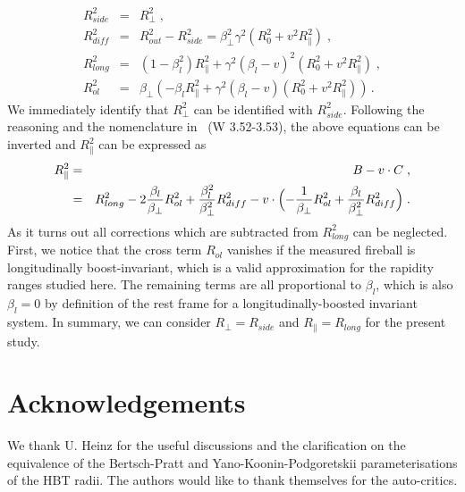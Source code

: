 \documentclass[a4paper,11pt]{scrartcl} %
\begin{document}
\begin{appendix}
\begin{eqnarray}
R_{side}^{2}    &=& R_{\perp}^{2}  \;, \\
R_{diff}^{2} &=& R_{out}^{2} -  R_{side}^{2} = \beta_{\perp}^2 \gamma^2 (R_{0}^2 + v^2R_{\parallel}^2) \;, \\
R_{long}^{2}     &=& (1 - \beta_l^2) R_{\parallel}^2 + \gamma^2 (\beta_l - v)^2 (R_{0}^2 + v^2R_{\parallel}^2) \;, \\
R_{ol}^{2}   &=& \beta_{\perp} (-\beta_l R_{\parallel}^{2} +  \gamma^2 (\beta_l - v)(R_{0}^2 + v^2R_{\parallel}^2)) \,.
\end{eqnarray}
%
We immediately identify that $R_{\perp}^2$ can be identified with $R_{side}^{2}$. Following the reasoning and the nomenclature in~\cite{Wiedemann:1999qn} (W 3.52-3.53), the above equations can be inverted and $R_{\parallel}^{2}$ can be expressed as 
%
\begin{eqnarray}
R_{\parallel}^{2} &=& B  - v \cdot C \;, \\
                          &=& R_{long}^2 - 2{\beta_l \over \beta_\perp}  R_{ol}^2 + {\beta_l^2 \over \beta_\perp^2} R_{diff}^2 
                          - v \cdot \Bigl(-{1 \over \beta_\perp } R_{ol}^2 + {\beta_l \over \beta_\perp^2} R_{diff}^2  \Bigr) \; .
\end{eqnarray}
%
As it turns out all corrections which are subtracted from $R_{long}^{2}$ can be neglected. First, we notice that the cross term $R_{ol}$ vanishes if the measured fireball is longitudinally boost-invariant, which is a valid approximation for the rapidity ranges studied here. The remaining terms are all proportional to $\beta_l$, which is also $\beta_l = 0$ by definition of the rest frame for a longitudinally-boosted invariant system. In summary, we can consider $R_{\perp} = R_{side}$ and $R_{\parallel}=R_{long}$ for the present study.


\end{appendix}


\newenvironment{acknowledgement}{\relax}{\relax}
\begin{acknowledgement}
\section*{Acknowledgements}
We thank U. Heinz for the useful discussions and the clarification on the equivalence of the Bertsch-Pratt and Yano-Koonin-Podgoretskii parameterisations of the HBT radii.
The authors would like to thank themselves for the auto-critics.

\end{acknowledgement}



 	

\end{document}
